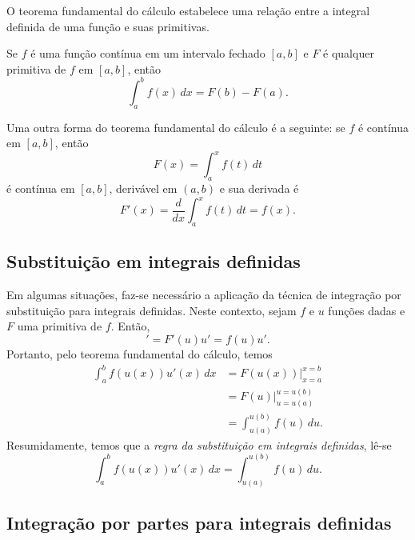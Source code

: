 O teorema fundamental do cálculo estabelece uma relação entre a integral definida de uma função e suas primitivas.

\begin{teo}
  Se $f$ é uma função contínua em um intervalo fechado $[a, b]$ e $F$ é qualquer primitiva de $f$ em $[a, b]$, então
  \begin{equation}
    \int_a^b f(x)\,dx = F(b)-F(a).
  \end{equation}
\end{teo}

\begin{obs}\label{obs:tfc1}
  Uma outra forma do teorema fundamental do cálculo é a seguinte: se $f$ é contínua em $[a, b]$, então
  \begin{equation}
    F(x) = \int_a^x f(t)\,dt
  \end{equation}
  é contínua em $[a, b]$, derivável em $(a, b)$ e sua derivada é
  \begin{equation}
    F'(x) = \frac{d}{dx}\int_a^x f(t)\,dt = f(x).
  \end{equation}
\end{obs}

\subsection{Substituição em integrais definidas}

Em algumas situações, faz-se necessário a aplicação da técnica de integração por substituição para integrais definidas. Neste contexto, sejam $f$ e $u$ funções dadas e $F$ uma primitiva de $f$. Então,
\begin{equation}
  [F(u)]' = F'(u)u' = f(u)u'.
\end{equation}
Portanto, pelo teorema fundamental do cálculo, temos
\begin{align}
  \int_a^b f(u(x))u'(x)\,dx &= F(u(x))|_{x=a}^{x=b}\\
                            &= F(u)|_{u=u(a)}^{u=u(b)}\\
                            &= \int_{u(a)}^{u(b)} f(u)\,du.
\end{align}
Resumidamente, temos que a \emph{regra da substituição em integrais definidas}, lê-se
\begin{equation}
  \int_a^b f(u(x))u'(x)\,dx = \int_{u(a)}^{u(b)} f(u)\,du.
\end{equation}

\subsection{Integração por partes para integrais definidas}

